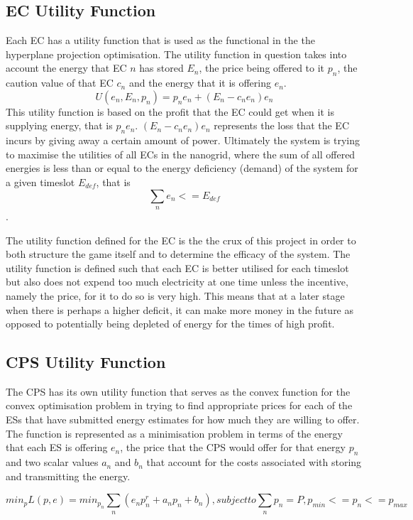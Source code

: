 \documentclass[a4paper, notitlepage]{report}
\begin{document}
\subsection{EC Utility Function}
\label{sec:orgc8aa988}
Each EC has a utility function that is used as the functional in the the
hyperplane projection optimisation. The utility function in question takes into
account the energy that EC \(n\) has stored \(E_n\), the price being offered to it
\(p_n\), the caution value of that EC \(c_n\) and the energy that it is offering \(e_n\).
$$ U(e_n, E_n, p_n) = p_{n}e_{n} + (E_{n} - c_{n}e_{n})e_{n} $$ 
This utility function is based on the profit that the EC could get when it is
supplying energy, that is \(p_{n}e_{n}\). \((E_{n} - c_{n}e_{n})e_{n}\) represents
the loss that the EC incurs by giving away a certain amount of power. Ultimately
the system is trying to maximise the utilities of all ECs in the nanogrid, where
the sum of all offered energies is less than or equal to the energy deficiency
(demand) of the system for a given timeslot \(E_{def}\), that is $$\sum_n e_n <=
E_{def}$$. 

The utility function defined for the EC is the the crux of this project in order
to both structure the game itself and to determine the efficacy of the system.
The utility function is defined such that each EC is better utilised for each
timeslot but also does not expend too much electricity at one time unless the
incentive, namely the price, for it to do so is very high. This means that at a
later stage when there is perhaps a higher deficit, it can make more money in
the future as opposed to potentially being depleted of energy for the times of
high profit.
\subsection{CPS Utility Function}
\label{sec:orgc120201}
The CPS has its own utility function that serves as the convex function for the
convex optimisation problem in trying to find appropriate prices for each of the
ESs that have submitted energy estimates for how much they are willing to offer.
The function is represented as a minimisation problem in terms of the energy
that each ES is offering \(e_n\), the price that the CPS would offer for that
energy \(p_n\) and two scalar values \(a_n\) and \(b_n\)  that account for the costs
associated with storing and transmitting the energy.

$$min_p L(p,e) = min_{p_{n}} \sum_n(e_{n}p_n^r + a_{n}p_{n} + b_n), subject to
\sum_n p_n = P, p_{min} <= p_n <= p_{max}$$
\end{document}
